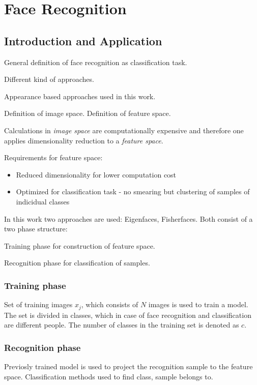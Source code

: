 
\section{Face Recognition}

  \subsection{Introduction and Application}
    General definition of face recognition as classification task.

    Different kind of approaches.

    Appearance based approaches used in this work.

    Definition of image space.
    Definition of feature space.

    Calculations in \textit{image space} are computationally expensive and  therefore
    one applies dimensionality reduction to a \textit{feature space}.

    Requirements for feature space:
    \begin{itemize}
    \item Reduced dimensionality for lower computation cost
    \item Optimized for classification task - no smearing but clustering of samples of indicidual classes
    \end{itemize}

    In this work two approaches are used: Eigenfaces, Fisherfaces.
    Both consist of a two phase structure:

    Training phase for construction of feature space.

    Recognition phase for classification of samples.


    \subsubsection{Training phase}
    Set of training images ${ x_j }$, which consists of $N$ images is used to train a model.
    The set is divided in classes, which in case of face recognition and classification are
     different people. The number of classes in the training set is denoted as $c$.

    \subsubsection{Recognition phase}
    Previosly trained model is used to project the recognition sample to the feature space.
    Classification methods used to find class, sample belongs to.


